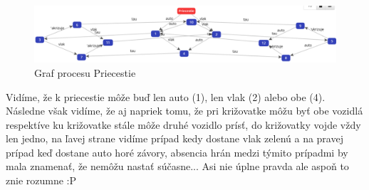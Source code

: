 \documentclass[a4paper]{article}
\begin{document}
\begin{figure}[!h]
	\centering
	\includegraphics[width=1\textwidth]{priecestie.png}
	\caption{Graf procesu Priecestie}
\end{figure}

Vidíme, že k priecestie môže buď len auto (1), len vlak (2) alebo obe (4). Následne však vidíme, že aj napriek tomu, že pri križovatke môžu byť obe vozidlá respektíve ku križovatke stále môže druhé vozidlo prísť, do križovatky vojde vždy len jedno, na ľavej strane vidíme prípad kedy dostane vlak zelenú a na pravej prípad keď dostane auto horé závory, absencia hrán medzi týmito prípadmi by mala znamenať, že nemôžu nastať súčasne... Asi nie úplne pravda ale aspoň to znie rozumne :P
\end{document}
